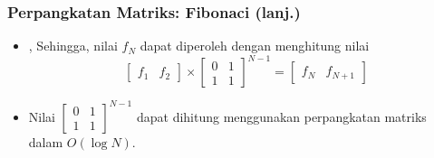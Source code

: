 \begin{frame}
\frametitle{Perpangkatan Matriks: Fibonaci (lanj.)}
\begin{itemize}
  \item, Sehingga, nilai $f_N$ dapat diperoleh dengan menghitung nilai
  \[
    \begin{bmatrix} f_1 & f_2 \end{bmatrix} \times
    \begin{bmatrix} 0 & 1 \\ 1 & 1  \end{bmatrix}^{N - 1} =
    \begin{bmatrix} f_N & f_{N+1} \end{bmatrix}
  \]
  \item Nilai $\begin{bmatrix} 0 & 1 \\ 1 & 1  \end{bmatrix}^{N - 1}$ dapat dihitung menggunakan perpangkatan matriks dalam $O(\log N)$.
\end{itemize}
\end{frame}



